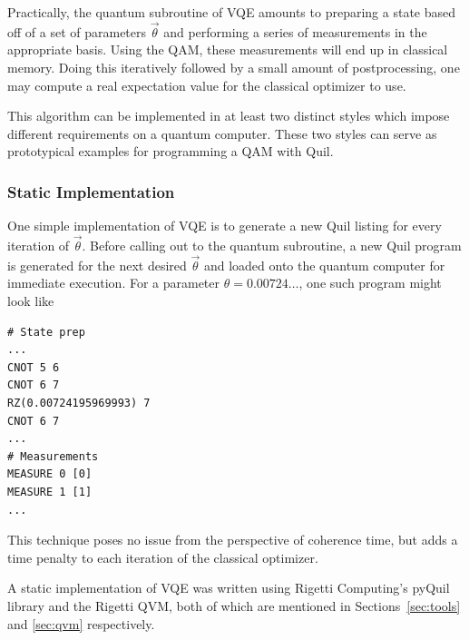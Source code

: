 \documentclass[conference]{IEEEtran}
\begin{document}
Practically, the quantum subroutine of VQE amounts to preparing a state based off of a set of parameters $\vec\theta$ and performing a series of measurements in the appropriate basis. Using the QAM, these measurements will end up in classical memory. Doing this iteratively followed by a small amount of postprocessing, one may compute a real expectation value for the classical optimizer to use.

This algorithm can be implemented in at least two distinct styles which impose different requirements on a quantum computer.  These two styles can serve as prototypical examples for programming a QAM with Quil.

\subsubsection{Static Implementation}
One simple implementation of VQE is to generate a new Quil listing for every iteration of $\vec\theta$. Before calling out to the quantum subroutine, a new Quil program is generated for the next desired $\vec\theta$ and loaded onto the quantum computer for immediate execution. For a parameter $\theta=0.00724\ldots$, one such program might look like
\begin{verbatim}
# State prep
...
CNOT 5 6
CNOT 6 7
RZ(0.00724195969993) 7
CNOT 6 7
...
# Measurements
MEASURE 0 [0]
MEASURE 1 [1]
...
\end{verbatim}

This technique poses no issue from the perspective of coherence time, but adds a time penalty to each iteration of the classical optimizer.

A static implementation of VQE was written using Rigetti Computing's pyQuil library and the Rigetti QVM, both of which are mentioned in Sections~\ref{sec:tools} and \ref{sec:qvm} respectively.
\end{document}
